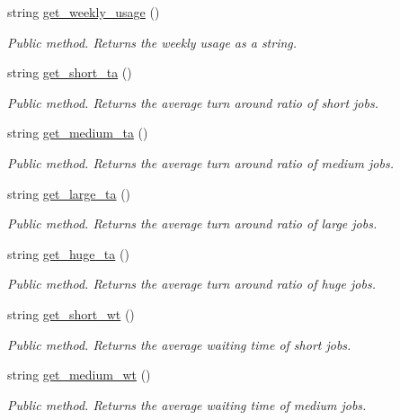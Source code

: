 \begin{DoxyCompactItemize}
string \hyperlink{classStatistics_a6f5e39adedce4de0c0983619fb8498c8}{get\+\_\+weekly\+\_\+usage} ()
\begin{DoxyCompactList}\small\item\em Public method. Returns the weekly usage as a string. \end{DoxyCompactList}\item 
string \hyperlink{classStatistics_a7858a6d068d7c56d29a5f54c20a8521c}{get\+\_\+short\+\_\+ta} ()
\begin{DoxyCompactList}\small\item\em Public method. Returns the average turn around ratio of short jobs. \end{DoxyCompactList}\item 
string \hyperlink{classStatistics_a114925dbd18467fed3db887104d27807}{get\+\_\+medium\+\_\+ta} ()
\begin{DoxyCompactList}\small\item\em Public method. Returns the average turn around ratio of medium jobs. \end{DoxyCompactList}\item 
string \hyperlink{classStatistics_a6f0aacba4f01c18cc9da75b1cb2f3e51}{get\+\_\+large\+\_\+ta} ()
\begin{DoxyCompactList}\small\item\em Public method. Returns the average turn around ratio of large jobs. \end{DoxyCompactList}\item 
string \hyperlink{classStatistics_a6afcfec266fe44d1c876be80f09f6de3}{get\+\_\+huge\+\_\+ta} ()
\begin{DoxyCompactList}\small\item\em Public method. Returns the average turn around ratio of huge jobs. \end{DoxyCompactList}\item 
string \hyperlink{classStatistics_abef59b8f494093e62ff1a27bd989e42a}{get\+\_\+short\+\_\+wt} ()
\begin{DoxyCompactList}\small\item\em Public method. Returns the average waiting time of short jobs. \end{DoxyCompactList}\item 
string \hyperlink{classStatistics_aa20489eecdafe0ebcac554f34b60caef}{get\+\_\+medium\+\_\+wt} ()
\begin{DoxyCompactList}\small\item\em Public method. Returns the average waiting time of medium jobs. \end{DoxyCompactList}\item 

\end{DoxyCompactItemize}

